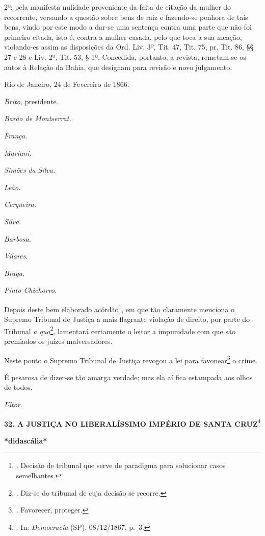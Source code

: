 2º: pela manifesta nulidade proveniente da falta de citação da mulher do
recorrente, versando a questão sobre bens de raiz e fazendo-se penhora
de tais bens, vindo por este modo a dar-se uma sentença contra uma parte
que não foi primeiro citada, isto é, contra a mulher casada, pelo que
toca a sua meação, violando-es assim as disposições da Ord. Liv. 3º,
Tit. 47, Tit. 75, pr. Tit. 86, §§ 27 e 28 e Liv. 2º, Tit. 53, § 1º.
Concedida, portanto, a revista, remetam-se os autos à Relação da Bahia,
que designam para revisão e novo julgamento.

Rio de Janeiro, 24 de Fevereiro de 1866.

\emph{Brito,} presidente\emph{.}

\emph{Barão de Montserrat.}

\emph{França.}

\emph{Mariani.}

\emph{Simões da Silva.}

\emph{Leão.}

\emph{Cerqueira.}

\emph{Silva.}

\emph{Barbosa.}

\emph{Vilares.}

\emph{Braga.}

\emph{Pinto Chichorro.}

Depois deste bem elaborado acórdão\footnote{. Decisão de tribunal que
  serve de paradigma para solucionar casos semelhantes.}, em que tão
claramente menciona o Supremo Tribunal de Justiça a mais flagrante
violação de direito, por parte do Tribunal \emph{a quo}\footnote{.
  Diz-se do tribunal de cuja decisão se recorre.}, lamentará certamente
o leitor a impunidade com que são premiados os juízes malversadores.

Neste ponto o Supremo Tribunal de Justiça revogou a lei para
favonear\footnote{. Favorecer, proteger.} o crime.

É pesarosa de dizer-se tão amarga verdade; mas ela aí fica estampada aos
olhos de todos.

\emph{Ultor}.

\textbf{32. A JUSTIÇA NO LIBERALÍSSIMO IMPÉRIO DE SANTA CRUZ}\footnote{.
  In: \emph{Democracia} (SP), 08/12/1867, p.~3.}

\textbf{*didascália*}

